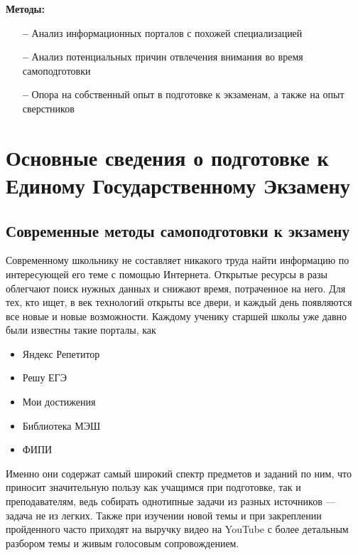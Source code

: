 \documentclass[a4paper, 12pt]{extarticle}
\begin{document}
\vspace{2mm}
\textbf{Методы:}
\begin{itemize}
    \item[\bfseries--] Анализ информационных порталов с похожей специализацией
    \item[\bfseries--] Анализ потенциальных причин отвлечения внимания во время
        самоподготовки
    \item[\bfseries--] Опора на собственный опыт в подготовке к экзаменам, а
        также на опыт сверстников
\end{itemize}
\newpage

\section{Основные сведения о подготовке к Единому Государственному Экзамену}
\subsection{Современные методы самоподготовки к экзамену}
\vspace{2mm}
Современному школьнику не составляет никакого труда найти информацию по
интересующей его теме с помощью Интернета. Открытые ресурсы в разы облегчают
поиск нужных данных и снижают время, потраченное на него. Для тех, кто ищет, в век
технологий открыты все двери, и каждый день появляются все новые и новые
возможности. Каждому ученику старшей школы уже давно были известны такие
порталы, как
\begin{itemize}
    \item {\small Яндекс Репетитор\par}
    \item {\small Решу ЕГЭ\par}
    \item {\small Мои достижения\par}
    \item {\small Библиотека МЭШ\par}
    \item {\small ФИПИ\par}
\end{itemize}
Именно они содержат самый широкий спектр предметов и заданий по ним, что
приносит значительную пользу как учащимся при подготовке, так и преподавателям, ведь собирать
однотипные задачи из разных источников — задача не из легких. Также при изучении
новой темы и при закреплении пройденного часто приходят на выручку видео на
YouTube с более детальным разбором темы и живым голосовым сопровождением.
\\
\end{document}
